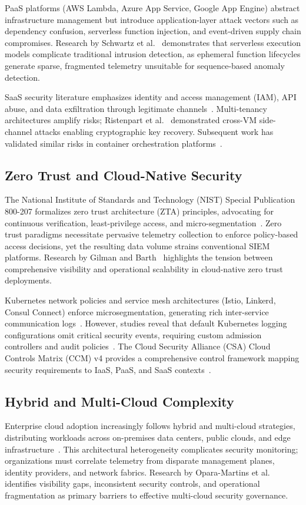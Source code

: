 PaaS platforms (AWS Lambda, Azure App Service, Google App Engine) abstract infrastructure management but introduce application-layer attack vectors such as dependency confusion, serverless function injection, and event-driven supply chain compromises. Research by Schwartz et al.~\cite{schwartz2021serverless} demonstrates that serverless execution models complicate traditional intrusion detection, as ephemeral function lifecycles generate sparse, fragmented telemetry unsuitable for sequence-based anomaly detection.

SaaS security literature emphasizes identity and access management (IAM), API abuse, and data exfiltration through legitimate channels~\cite{modi2013cloud}. Multi-tenancy architectures amplify risks; Ristenpart et al.~\cite{ristenpart2009cloud} demonstrated cross-VM side-channel attacks enabling cryptographic key recovery. Subsequent work has validated similar risks in container orchestration platforms~\cite{sultan2019container}.

\subsection{Zero Trust and Cloud-Native Security}
The National Institute of Standards and Technology (NIST) Special Publication 800-207 formalizes zero trust architecture (ZTA) principles, advocating for continuous verification, least-privilege access, and micro-segmentation~\cite{nist800207}. Zero trust paradigms necessitate pervasive telemetry collection to enforce policy-based access decisions, yet the resulting data volume strains conventional SIEM platforms. Research by Gilman and Barth~\cite{gilman2017zerotrust} highlights the tension between comprehensive visibility and operational scalability in cloud-native zero trust deployments.

Kubernetes network policies and service mesh architectures (Istio, Linkerd, Consul Connect) enforce microsegmentation, generating rich inter-service communication logs~\cite{burns2019kubernetes}. However, studies reveal that default Kubernetes logging configurations omit critical security events, requiring custom admission controllers and audit policies~\cite{pahl2019containerization}. The Cloud Security Alliance (CSA) Cloud Controls Matrix (CCM) v4 provides a comprehensive control framework mapping security requirements to IaaS, PaaS, and SaaS contexts~\cite{csa2023ccm}.

\subsection{Hybrid and Multi-Cloud Complexity}
Enterprise cloud adoption increasingly follows hybrid and multi-cloud strategies, distributing workloads across on-premises data centers, public clouds, and edge infrastructure~\cite{gartner2023hybrid}. This architectural heterogeneity complicates security monitoring; organizations must correlate telemetry from disparate management planes, identity providers, and network fabrics. Research by Opara-Martins et al.~\cite{oparamartins2016multicloud} identifies visibility gaps, inconsistent security controls, and operational fragmentation as primary barriers to effective multi-cloud security governance.

